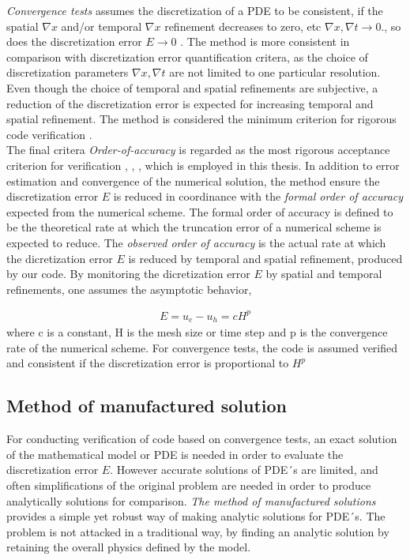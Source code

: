 \textit{Convergence tests} assumes the discretization of a PDE to be consistent, if the spatial $\nabla x$ and/or temporal $\nabla x$ refinement decreases to zero, etc $\nabla x, \nabla t \rightarrow 0$., so does the discretization error $E  \rightarrow 0$ \cite{Biggs}. The method is  more consistent in comparison with discretization error quantification critera, as the choice of discretization parameters $\nabla x, \nabla t$ are not limited to one particular  resolution. Even though the choice of temporal and spatial refinements are subjective, a reduction of the discretization error is expected for increasing temporal and spatial refinement. The method is considered the minimum criterion for rigorous code verification \cite{Roache}. \\
The final critera \textit{Order-of-accuracy}  is regarded as the most rigorous acceptance criterion for verification \cite{Biggs}, \cite{Roache}, \cite{Etienne2006}, which is employed in this thesis. In addition to error estimation and convergence of the numerical solution, the method ensure the discretization error $E$ is reduced in coordinance with the \textit{formal order of accuracy} expected from the numerical scheme. The formal order of accuracy is defined to be the theoretical rate at which the truncation error of a numerical scheme is expected to reduce. The \textit{observed order of accuracy} is the actual rate at which the dicretization error $E$ is reduced by temporal and spatial refinement, produced by our code. By monitoring the dicretization error $E$ by spatial and temporal refinements, one assumes the asymptotic behavior,

\begin{align*}
E = u_e - u_h = cH^p
\end{align*} 
where c is a constant, H is the mesh size or time step and p is the convergence rate of the numerical scheme. For convergence tests, the code is assumed verified and consistent if the discretization error is proportional to $H^p$

\subsection{Method of manufactured solution}

For conducting verification of code based on convergence tests, an exact solution of the mathematical model or PDE is needed in order to evaluate the discretization error $E$. However accurate solutions of PDE´s are limited, and often simplifications of the original problem are needed in order to produce analytically solutions for comparison. 
\textit{The method of manufactured solutions} provides a simple yet robust way of making analytic solutions for PDE´s. The problem is not attacked in a traditional way, by finding an analytic solution by retaining the overall physics defined by the model. 

